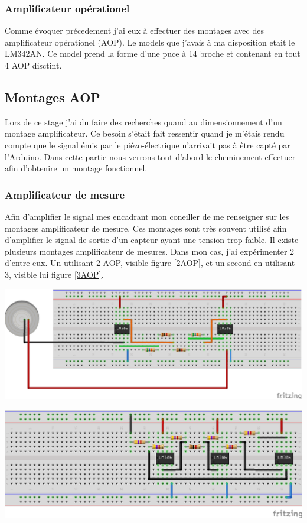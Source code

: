 \documentclass[12pt,french,a4paper]{article}
\begin{document}
\newpage
\subsubsection{Amplificateur opérationel} 
Comme évoquer précedement j'ai eux à effectuer des montages avec des amplificateur opérationel (AOP). Le models que j'avais à ma disposition etait le LM342AN. Ce model prend la forme d'une puce à 14 broche et contenant en tout 4 AOP disctint. 

\subsection{Montages AOP}
Lors de ce stage j'ai du faire des recherches quand au dimensionnement d'un montage amplificateur. Ce besoin s'était fait ressentir quand je m'étais rendu compte que le signal émis par le piézo-électrique n'arrivait pas à être capté par l'Arduino.  Dans cette partie nous verrons tout d'abord le cheminement effectuer afin d'obtenire un montage fonctionnel. 

\subsubsection{Amplificateur de mesure}

Afin d'amplifier le signal mes encadrant mon coneiller de me renseigner sur les montages amplificateur de mesure. Ces montages sont très souvent utilisé afin d’amplifier le signal de sortie d’un capteur ayant une tension trop faible.
Il existe plusieurs montages amplificateur de mesures. Dans mon cas, j’ai expérimenter 2 d'entre eux. Un utilisant 2 AOP, visible figure \ref{2AOP}, et un second en utilisant 3, visible lui figure \ref{3AOP}. 

\begin{center}	
\includegraphics[scale=0.80]{../img/instrumentation2aop_bb.png}
\label{2AOP}
\end{center}

\begin{center}	
\includegraphics[scale=1]{../img/instrumentation3aop_bb.png}
\label{3AOP}
\end{center}
\end{document}
